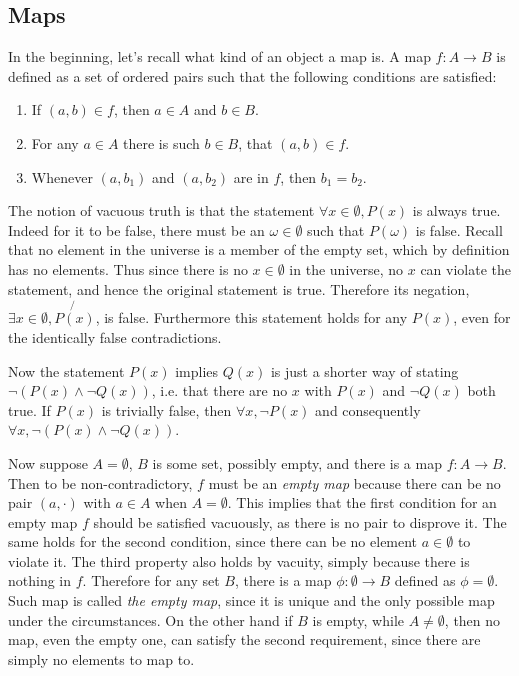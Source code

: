 \documentclass[a4paper]{article}
\newcommand{\brac}[1]{{\left({#1}\right)}}
\begin{document}
\subsection{Maps} %
\label{sub:maps}
In the beginning, let's recall what kind of an object a map is. A map $f:A\to B$ is defined as a set of ordered pairs such that the following conditions are satisfied:
\begin{enumerate}
	\item If $\brac{a, b}\in f$, then $a\in A$ and $b\in B$.
	\item For any $a\in A$ there is such $b\in B$, that $\brac{a, b}\in f$.
	\item Whenever $\brac{a, b_1}$ and $\brac{a, b_2}$ are in $f$, then $b_1=b_2$.
\end{enumerate}
The notion of vacuous truth is that the statement $\forall{x\in \emptyset},P(x)$ is always true. Indeed for it to be false, there must be an $\omega\in \emptyset$ such that $P(\omega)$ is false. Recall that no element in the universe is a member of the empty set, which by definition has no elements. Thus since there is no $x\in \emptyset$ in the universe, no $x$ can violate the statement, and hence the original statement is true. Therefore its negation, $\exists{x\in \emptyset},\not{P(x)}$, is false. Furthermore this statement holds for any $P(x)$, even for the identically false contradictions.

Now the statement $P(x)$ implies $Q(x)$ is just a shorter way of stating $\neg\brac{P(x) \land \neg Q(x)}$, i.e. that there are no $x$ with $P(x)$ and $\neg Q(x)$ both true. If $P(x)$ is trivially false, then $\forall{x},\neg P(x)$ and consequently $\forall{x},\neg \brac{P(x) \land \neg Q(x)}$.

Now suppose $A=\emptyset$, $B$ is some set, possibly empty, and there is a map $f:A\to B$. Then to be non-contradictory, $f$ must be an \emph{empty map} because there can be no pair $\brac{a, \cdot}$ with $a\in A$ when $A=\emptyset$. This implies that the first condition for an empty map $f$ should be satisfied vacuously, as there is no pair to disprove it. The same holds for the second condition, since there can be no element $a\in \emptyset$ to violate it. The third property also holds by vacuity, simply because there is nothing in $f$. Therefore for any set $B$, there is a map $\phi:\emptyset\to B$ defined as $\phi=\emptyset$. Such map is called \emph{the empty map}, since it is unique and the only possible map under the circumstances. On the other hand if $B$ is empty, while $A\neq \emptyset$, then no map, even the empty one, can satisfy the second requirement, since there are simply no elements to map to.
\end{document}
